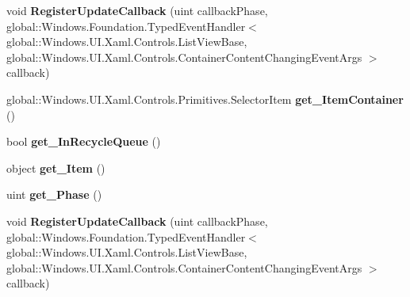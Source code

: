 \begin{DoxyCompactItemize}
void {\bfseries Register\+Update\+Callback} (uint callback\+Phase, global\+::\+Windows.\+Foundation.\+Typed\+Event\+Handler$<$ global\+::\+Windows.\+U\+I.\+Xaml.\+Controls.\+List\+View\+Base, global\+::\+Windows.\+U\+I.\+Xaml.\+Controls.\+Container\+Content\+Changing\+Event\+Args $>$ callback)
\item 
\mbox{\label{interface_windows_1_1_u_i_1_1_xaml_1_1_controls_1_1_i_container_content_changing_event_args_acbc05dfed05ddf98a734f2dfef63244c}} 
global\+::\+Windows.\+U\+I.\+Xaml.\+Controls.\+Primitives.\+Selector\+Item {\bfseries get\+\_\+\+Item\+Container} ()
\item 
\mbox{\label{interface_windows_1_1_u_i_1_1_xaml_1_1_controls_1_1_i_container_content_changing_event_args_a4d50cd4c2e41b7824eb299ae3a98881b}} 
bool {\bfseries get\+\_\+\+In\+Recycle\+Queue} ()
\item 
\mbox{\label{interface_windows_1_1_u_i_1_1_xaml_1_1_controls_1_1_i_container_content_changing_event_args_a10ddd7510b58dc1746dc1d24aa4f40ae}} 
object {\bfseries get\+\_\+\+Item} ()
\item 
\mbox{\label{interface_windows_1_1_u_i_1_1_xaml_1_1_controls_1_1_i_container_content_changing_event_args_a738ad9fa4dbda62eecb572e7177f20c5}} 
uint {\bfseries get\+\_\+\+Phase} ()
\item 
\mbox{\label{interface_windows_1_1_u_i_1_1_xaml_1_1_controls_1_1_i_container_content_changing_event_args_a667cd37ef9c242308e80a5eeb302226a}} 
void {\bfseries Register\+Update\+Callback} (uint callback\+Phase, global\+::\+Windows.\+Foundation.\+Typed\+Event\+Handler$<$ global\+::\+Windows.\+U\+I.\+Xaml.\+Controls.\+List\+View\+Base, global\+::\+Windows.\+U\+I.\+Xaml.\+Controls.\+Container\+Content\+Changing\+Event\+Args $>$ callback)
\item 
\mbox{\label{interface_windows_1_1_u_i_1_1_xaml_1_1_controls_1_1_i_container_content_changing_event_args_acbc05dfed05ddf98a734f2dfef63244c}} 

\end{DoxyCompactItemize}
